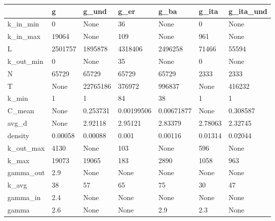 \begin{tabular}{lllllll}
\toprule
{} &        g &     g\_und &        g\_er &        g\_ba &    g\_ita & g\_ita\_und \\
\midrule
k\_in\_min  &        0 &      None &          36 &        None &        0 &      None \\
k\_in\_max  &    19064 &      None &         109 &        None &      961 &      None \\
L         &  2501757 &   1895878 &     4318406 &     2496258 &    71466 &     55594 \\
k\_out\_min &        0 &      None &          35 &        None &        0 &      None \\
N         &    65729 &     65729 &       65729 &       65729 &     2333 &      2333 \\
T         &     None &  22765186 &      376972 &      996837 &     None &    416232 \\
k\_min     &        1 &         1 &          84 &          38 &        1 &         1 \\
C\_mean    &     None &  0.253731 &  0.00199506 &  0.00671877 &     None &  0.308587 \\
avg\_d     &     None &   2.92118 &     2.95121 &     2.83379 &  2.78063 &   2.32745 \\
density   &  0.00058 &   0.00088 &       0.001 &     0.00116 &  0.01314 &   0.02044 \\
k\_out\_max &     4130 &      None &         103 &        None &      596 &      None \\
k\_max     &    19073 &     19065 &         183 &        2890 &     1058 &       963 \\
gamma\_out &      2.9 &      None &        None &        None &     None &      None \\
k\_avg     &       38 &        57 &          65 &          75 &       30 &        47 \\
gamma\_in  &      2.4 &      None &        None &        None &     None &      None \\
gamma     &      2.6 &      None &        None &         2.9 &      2.3 &      None \\
\bottomrule
\end{tabular}

